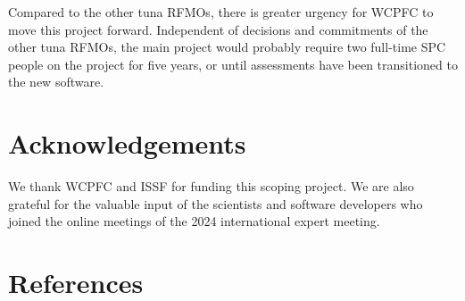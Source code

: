 \documentclass{SCreport}
\begin{document}
Compared to the other tuna RFMOs, there is greater urgency for WCPFC to move
this project forward. Independent of decisions and commitments of the other tuna
RFMOs, the main project would probably require two full-time SPC people on the
project for five years, or until assessments have been transitioned to the new
software.

\section{Acknowledgements}

We thank WCPFC and ISSF for funding this scoping project. We are also grateful
for the valuable input of the scientists and software developers who joined the
online meetings of the 2024 international expert meeting.

\section{References}

\sloppy\setlength{}
\end{document}
